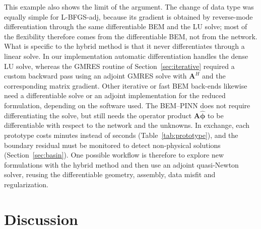 \documentclass[11pt,twoside]{article}
\begin{document}
\begin{table}[ht!]
\centering
\caption{Inversion from amplitude-only records $|u^{obs}_r|$: shape error for three noise levels and mean wall-clock time per inversion. Same configuration as Table~\ref{tab:inverse}; only the data residual was changed.}
\label{tab:prototype}
\scriptsize
\setlength{\tabcolsep}{4pt}

\end{table}

This example also shows the limit of the argument. The change of data type was equally simple for L-BFGS-adj, because its gradient is obtained by reverse-mode differentiation through the same differentiable BEM and the LU solve; most of the flexibility therefore comes from the differentiable BEM, not from the network. What is specific to the hybrid method is that it never differentiates through a linear solve. In our implementation automatic differentiation handles the dense LU solve, whereas the GMRES routine of Section~\ref{sec:iterative} required a custom backward pass using an adjoint GMRES solve with $\mathbf{A}^H$ and the corresponding matrix gradient. Other iterative or fast BEM back-ends likewise need a differentiable solve or an adjoint implementation for the reduced formulation, depending on the software used. The BEM--PINN does not require differentiating the solve, but still needs the operator product $\mathbf{A}\hat{\boldsymbol{\phi}}$ to be differentiable with respect to the network and the unknowns. In exchange, each prototype costs minutes instead of seconds (Table~\ref{tab:prototype}), and the boundary residual must be monitored to detect non-physical solutions (Section~\ref{sec:basin}). One possible workflow is therefore to explore new formulations with the hybrid method and then use an adjoint quasi-Newton solver, reusing the differentiable geometry, assembly, data misfit and regularization.

\section{Discussion}\label{sec:discussion}
\end{document}
